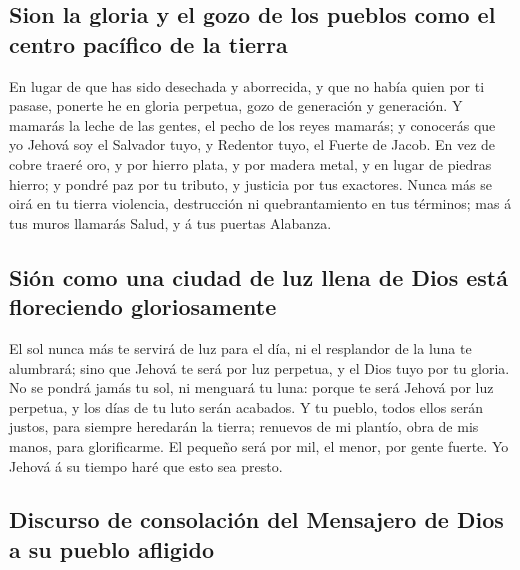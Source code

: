 \hypertarget{sion-la-gloria-y-el-gozo-de-los-pueblos-como-el-centro-pacuxedfico-de-la-tierra}{%
\subsection{Sion la gloria y el gozo de los pueblos como el centro
pacífico de la
tierra}\label{sion-la-gloria-y-el-gozo-de-los-pueblos-como-el-centro-pacuxedfico-de-la-tierra}}

 En lugar de que has sido desechada y aborrecida, y que no
había quien por ti pasase, ponerte he en gloria perpetua, gozo de
generación y generación.  Y mamarás la leche de las gentes,
el pecho de los reyes mamarás; y conocerás que yo Jehová soy el Salvador
tuyo, y Redentor tuyo, el Fuerte de Jacob.  En vez de cobre
traeré oro, y por hierro plata, y por madera metal, y en lugar de
piedras hierro; y pondré paz por tu tributo, y justicia por tus
exactores.  Nunca más se oirá en tu tierra violencia,
destrucción ni quebrantamiento en tus términos; mas á tus muros llamarás
Salud, y á tus puertas Alabanza.

\hypertarget{siuxf3n-como-una-ciudad-de-luz-llena-de-dios-estuxe1-floreciendo-gloriosamente}{%
\subsection{Sión como una ciudad de luz llena de Dios está floreciendo
gloriosamente}\label{siuxf3n-como-una-ciudad-de-luz-llena-de-dios-estuxe1-floreciendo-gloriosamente}}

 El sol nunca más te servirá de luz para el día, ni el
resplandor de la luna te alumbrará; sino que Jehová te será por luz
perpetua, y el Dios tuyo por tu gloria.  No se pondrá jamás
tu sol, ni menguará tu luna: porque te será Jehová por luz perpetua, y
los días de tu luto serán acabados.  Y tu pueblo, todos
ellos serán justos, para siempre heredarán la tierra; renuevos de mi
plantío, obra de mis manos, para glorificarme.  El pequeño
será por mil, el menor, por gente fuerte. Yo Jehová á su tiempo haré que
esto sea presto.

\hypertarget{discurso-de-consolaciuxf3n-del-mensajero-de-dios-a-su-pueblo-afligido}{%
\subsection{Discurso de consolación del Mensajero de Dios a su pueblo
afligido}\label{discurso-de-consolaciuxf3n-del-mensajero-de-dios-a-su-pueblo-afligido}}

